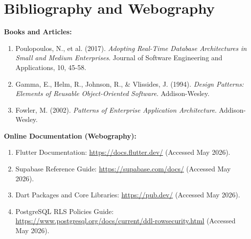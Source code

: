 \chapter*{Bibliography and Webography}

\noindent\textbf{Books and Articles:}
\begin{enumerate}
    \item Poulopoulos, N., et al. (2017). \textit{Adopting Real-Time Database Architectures in Small and Medium Enterprises}. Journal of Software Engineering and Applications, 10, 45-58.
    \item Gamma, E., Helm, R., Johnson, R., \& Vlissides, J. (1994). \textit{Design Patterns: Elements of Reusable Object-Oriented Software}. Addison-Wesley.
    \item Fowler, M. (2002). \textit{Patterns of Enterprise Application Architecture}. Addison-Wesley.
\end{enumerate}

\vspace{0.5cm}
\noindent\textbf{Online Documentation (Webography):}
\begin{enumerate}
    \item Flutter Documentation: \url{https://docs.flutter.dev/} (Accessed May 2026).
    \item Supabase Reference Guide: \url{https://supabase.com/docs/} (Accessed May 2026).
    \item Dart Packages and Core Libraries: \url{https://pub.dev/} (Accessed May 2026).
    \item PostgreSQL RLS Policies Guide: \url{https://www.postgresql.org/docs/current/ddl-rowsecurity.html} (Accessed May 2026).
\end{enumerate}
